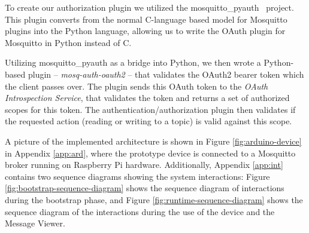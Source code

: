 \documentclass{IEEEtran}
\newif\iflong
\begin{document}
To create our authorization plugin we utilized the mosquitto\_pyauth~\cite{mosquitto-pyauth} project. This plugin converts from the normal
C-language based model for Mosquitto plugins into the Python language, allowing us to write the OAuth
plugin for Mosquitto in Python instead of C. 
\iflong
We did not assess the performance differences between writing in the native C model versus writing 
in Python as we were primarily aiming at experimenting with the model and the performance was adequate
for our tests. However, it would not be challenging to rewrite the plugin in pure C as most of the 
work is done by the remote Authorization Server. 
\fi

Utilizing mosquitto\_pyauth as a bridge into Python, we then wrote a Python-based plugin --
\emph{mosq-auth-oauth2} -- that validates the OAuth2 bearer token which the client passes over. 
The plugin sends this OAuth token to the \emph{OAuth Introspection Service}, 
that validates the token and returns a set of 
authorized scopes for this token. The authentication/authorization plugin then validates if 
the requested action (reading or writing to a topic) is valid against this scope.


A picture of the implemented architecture is shown in Figure \ref{fig:arduino-device} in Appendix \ref{app:ard}, where the prototype device is connected to a Mosquitto broker running on Raspberry Pi hardware.  Additionally, Appendix \ref{app:int} contains two sequence diagrams showing the system interactions: Figure \ref{fig:bootstrap-sequence-diagram} shows the sequence diagram of interactions during the bootstrap
phase, and Figure \ref{fig:runtime-sequence-diagram} shows the sequence diagram of the interactions during 
the use of the device and the Message Viewer.

\iflong
\end{document}
